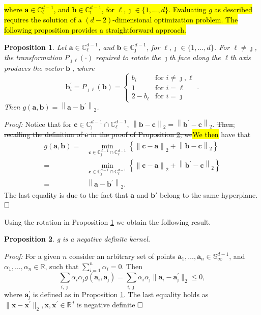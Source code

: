 \documentclass[iicol,sn-basic]{sn-jnl}
\newtheorem{prop}{Proposition}
\newcommand{\norm}[1]{\left\lVert #1 \right\rVert}
\newcommand{\pnorm}[2]{\norm{#1}_{#2}}
\theoremstyle{thmstyleone}
\begin{document}
\hl{where $\bm{a} \in {\mathbb C}_{\ell}^{d-1}$, and
$\bm{b} \in {\mathbb   C}_{\jmath}^{d-1}$, for $\ell,\jmath\in \{1,\ldots, d\}$.
Evaluating $g$ as described  requires the solution of a $(d-2)$-dimensional optimization problem.  The following proposition provides a straightforward approach.}
\begin{prop}\label{prop:rot}
Let $\bm{a} \in {\mathbb C}_{\ell}^{d-1}$, and $\bm{b} \in {\mathbb C}_{\jmath}^{d-1}$,
for $\ell, \jmath \in \{1, \ldots , d\}$.  For $\ell\neq \jmath$, the
transformation $P_{\jmath\ell}(\cdot)$ required to rotate the $\jmath$th face along the
$\ell$th axis produces the vector $\bm{b}^\prime$, where
\begin{equation}
\label{eqn:rotation}
\bm{b}^{\prime}_i = P_{\jmath\ell}(\bm{b}) =
\begin{cases}
b_{i} &\text{for }i\neq \jmath,\ell\\
1 &\text{for }i = \ell\\
2 - b_{\ell} &\text{for }i = \jmath
\end{cases}.
\end{equation}
Then $g(\bm{a},\bm{b}) = \pnorm{\bm{a} - \bm{b}^{\prime}}{2}$.
\end{prop}
{\em Proof:}
Notice that for
$\bm{c} \in {\mathbb C}_{\jmath}^{d-1}\cap{\mathbb C}_{\ell}^{d-1}$,
$\pnorm{\bm{b} - \bm{c}}{2} =  \pnorm{\bm{b}^{\prime} - \bm{c}}{2}$.\st{ Then, recalling the definition of $\bm{e}$ in the proof of Proposition \mbox{\ref{prop:g}}, we}\hl{We then} have that
\begin{equation*}
\begin{aligned}
g(\bm{a},\bm{b}) = &\min_{\bm{c} \in{\mathbb C}_{\jmath}^{d-1}\cap{\mathbb C}_{\ell}^{d-1}}\left\{
\pnorm{\bm{c}-\bm{a}}{2} + \pnorm{\bm{b}-\bm{c}}{2} \right\} \\
= &\min_{\bm{c} \in{\mathbb C}_{\jmath}^{d-1}\cap{\mathbb C}_{\ell}^{d-1}}\left\{
\pnorm{\bm{c}-\bm{a}}{2} + \pnorm{\bm{b}^{\prime}-\bm{c}}{2} \right\}\\
= & \pnorm{\bm{a} - \bm{b}^{\prime}}{2}.
\end{aligned}
\end{equation*}
The last equality is due to the fact that $\bm{a}$ and $\bm{b}'$ belong to the same hyperplane. $\hfill\Box$

Using the rotation in Proposition \ref{prop:rot} we obtain the following result.
\begin{prop}\label{prop:g}
g is a negative definite kernel.
\end{prop}
{\em Proof:} For a given $n$ consider an arbitrary set of points
$\bm{a}_1, \ldots , \bm{a}_n \in {\mathbb S}_\infty^{d-1}$, and
$\alpha_1, \ldots , \alpha_n \in {\mathbb R}$, such that $\sum_{i=1}^n
\alpha _i = 0$. Then
\[
\sum_{i,\jmath} \alpha_i \alpha_\jmath g(\bm{a}_i, \bm{a}_\jmath)
= \sum_{i,\jmath} \alpha_i \alpha_\jmath
\|\bm{a}_i - \bm{a}_\jmath^\prime\|_2 \leq 0,
\]
where $\bm{a}_\jmath^\prime$ is defined as in Proposition \ref{prop:rot}.
The last equality holds as $\|\bm{x} - \bm{x}^\prime\|_2, \bm{x},
\bm{x}^{\prime} \in {\mathbb R}^d$ is negative definite
\citep{gneiting2007}$\hfill\Box$
\end{document}
